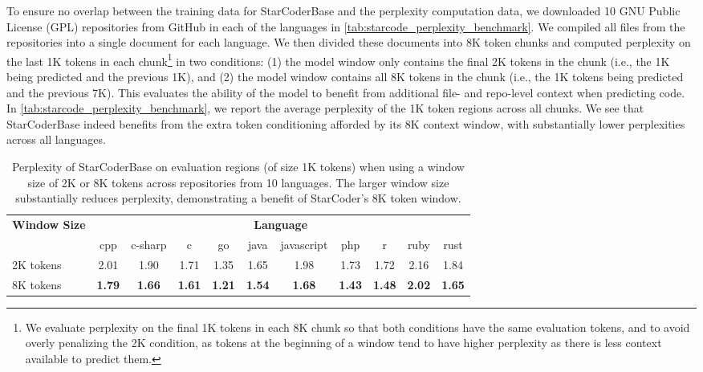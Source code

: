\documentclass[10pt]{article} %
\begin{document}
To ensure no overlap between the training data for StarCoderBase and the perplexity computation data, we downloaded 10 GNU Public License (GPL) repositories
from GitHub in each of the languages in \autoref{tab:starcode_perplexity_benchmark}. We compiled all files from the repositories into a single document for each language. We then divided these documents into 8K token chunks and computed perplexity on the last 1K tokens in each chunk\footnote{We evaluate perplexity on the final 1K tokens in each 8K chunk so that both conditions have the same evaluation tokens, and to avoid overly penalizing the 2K condition, as tokens at the beginning of a window tend to have higher perplexity as there is less context available to predict them.} in two conditions: (1) the model window only contains the final 2K tokens in the chunk (i.e., the 1K being predicted and the previous 1K), and (2) the model window contains all 8K tokens in the chunk (i.e., the 1K tokens being predicted and the previous 7K). This evaluates the ability of the model to benefit from additional file- and repo-level context when predicting code.
In \autoref{tab:starcode_perplexity_benchmark}, we report the average perplexity of the 1K token regions across all chunks. We see that StarCoderBase indeed benefits from the extra token conditioning afforded by its 8K context window, with substantially lower perplexities across all languages.

\begin{table}[t]
\centering
\begin{tabular}{lcccccccccc}
\toprule
\multirow{2}{*}{\textbf{Window Size} } & \multicolumn{10}{c}{\textbf{Language}} \\ \cmidrule{2-11}
 & cpp & c-sharp & c & go & java & javascript & php & r & ruby & rust \\
\midrule

2K tokens & 2.01 & 1.90 & 1.71 & 1.35 & 1.65 & 1.98 & 1.73 & 1.72 & 2.16 & 1.84 \\
8K tokens & \textbf{1.79} & \textbf{1.66} & \textbf{1.61} & \textbf{1.21} & \textbf{1.54} & \textbf{1.68} & \textbf{1.43} & \textbf{1.48} & \textbf{2.02} & \textbf{1.65} \\
\bottomrule
\end{tabular}
\caption{Perplexity of StarCoderBase on evaluation regions (of size 1K tokens) when using a window size of 2K or 8K tokens across repositories from 10 languages. The larger window size substantially reduces perplexity, demonstrating a benefit of StarCoder's 8K token window.}
\label{tab:starcode_perplexity_benchmark}
\end{table}
\end{document}
